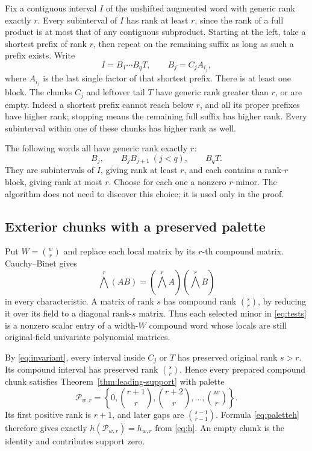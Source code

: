 Fix a contiguous interval $I$ of the unshifted augmented word with
generic rank exactly $r$. Every subinterval of $I$ has rank at least
$r$, since the rank of a full product is at most that of any contiguous
subproduct. Starting at the left, take a shortest prefix of rank $r$,
then repeat on the remaining suffix as long as such a prefix exists.
Write
\begin{equation}\label{eq:greedy}
 I=B_1\cdots B_qT,\qquad B_j=C_jA_{i_j},
\end{equation}
where $A_{i_j}$ is the last single factor of that shortest prefix.
There is at least one block. The chunks $C_j$ and leftover tail $T$
have generic rank greater than $r$, or are empty. Indeed a shortest
prefix cannot reach below $r$, and all its proper prefixes have
higher rank; stopping means the remaining full suffix has higher
rank. Every subinterval within one of these chunks has higher rank
as well.

The following words all have generic rank exactly $r$:
\begin{equation}\label{eq:tests}
 B_j,\qquad B_jB_{j+1}\ (j<q),\qquad B_qT.
\end{equation}
They are subintervals of $I$, giving rank at least $r$, and each
contains a rank-$r$ block, giving rank at most $r$. Choose for each
one a nonzero $r$-minor. The algorithm does not need to discover this
choice; it is used only in the proof.

\subsection{Exterior chunks with a preserved palette}

Put $W=\binom wr$ and replace each local matrix by its $r$-th
compound matrix. Cauchy--Binet gives
\[
 \bigwedge^r(AB)=(\bigwedge^rA)(\bigwedge^rB)
\]
in every characteristic. A matrix of rank $s$ has compound rank
$\binom sr$, by reducing it over its field to a diagonal rank-$s$
matrix. Thus each selected minor in \eqref{eq:tests} is a nonzero
scalar entry of a width-$W$ compound word whose locals are still
original-field univariate polynomial matrices.

By \eqref{eq:invariant}, every interval inside $C_j$ or $T$ has
preserved original rank $s>r$. Its compound interval has preserved
rank $\binom sr$. Hence every prepared compound chunk satisfies
Theorem~\ref{thm:leading-support} with palette
\[
 \mathcal P_{w,r}=\left\{0,\binom{r+1}{r},
                    \binom{r+2}{r},\ldots,\binom wr\right\}.
\]
Its first positive rank is $r+1$, and later gaps are
$\binom{s-1}{r-1}$. Formula \eqref{eq:paletteh} therefore gives
exactly $h(\mathcal P_{w,r})=h_{w,r}$ from \eqref{eq:h}.
An empty chunk is the identity and contributes support zero.

